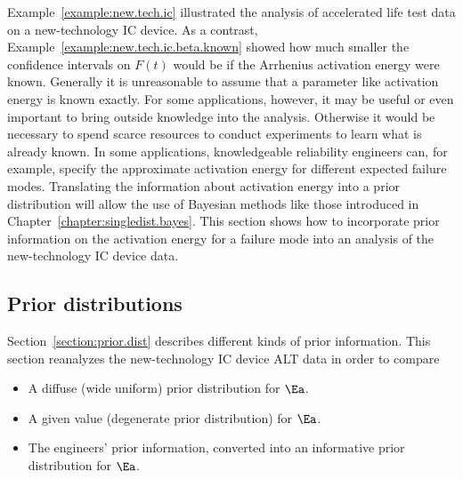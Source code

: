 Example~\ref{example:new.tech.ic} illustrated the analysis of
accelerated life test data on a new-technology IC device. As a
contrast, Example~\ref{example:new.tech.ic.beta.known} showed how
much smaller the confidence intervals on $F(t)$ would be if the
Arrhenius activation energy were known. Generally it is unreasonable
to assume that a parameter like activation energy is known
exactly. For some applications, however, it may be useful or even
important to bring outside knowledge into the analysis. Otherwise it
would be necessary to spend scarce resources to conduct experiments
to learn what is already known. In some applications, knowledgeable
reliability engineers can, for example, specify the approximate
activation energy for different expected failure modes.  Translating
the information about activation energy into a prior distribution
will allow the use of Bayesian methods like those introduced in
Chapter~\ref{chapter:singledist.bayes}. This section shows how to
incorporate prior information on the activation energy for a failure
mode into an analysis of the new-technology IC device data.

\subsection{Prior distributions}

Section~\ref{section:prior.dist} describes different kinds of prior
information.  This section reanalyzes the new-technology IC
device ALT data in order to compare 
\begin{itemize}
\item
A diffuse (wide uniform) prior distribution for $\Ea$.
\item
A given value (degenerate prior distribution) for $\Ea$.
\item
The engineers' prior information, converted into an informative
prior distribution for $\Ea$.
\end{itemize}

